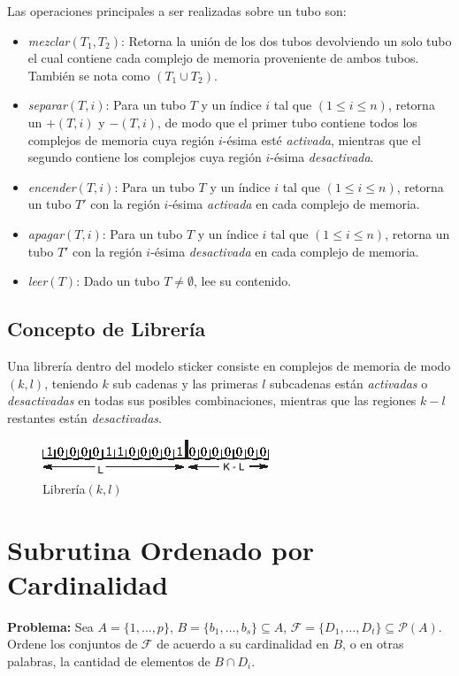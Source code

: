 \documentclass[12pt, letterpaper, twoside]{article}
\begin{document}
    Las operaciones principales a ser realizadas sobre un tubo son:
    \begin{itemize}
        \item \emph{mezclar}$(T_1,T_2)$: Retorna la unión de los dos tubos devolviendo un solo tubo el cual contiene cada complejo de memoria proveniente de ambos tubos. También se nota como $(T_1\cup T_2)$.
        \item \emph{separar}$(T, i)$: Para un tubo $T$ y un índice $i$ tal que $(1 \leq i \leq n)$, retorna un $+(T, i)$ y $-(T, i)$, de modo que el primer tubo contiene todos los complejos de memoria cuya región $i$-ésima esté \emph{activada}, mientras que el segundo contiene los complejos cuya región $i$-ésima \emph{desactivada}.
        \item \emph{encender}$(T, i)$: Para un tubo $T$ y un índice $i$ tal que $(1 \leq i \leq n)$, retorna un tubo $T'$ con la región $i$-ésima \emph{activada} en cada complejo de memoria.
        \item \emph{apagar}$(T, i)$: Para un tubo $T$ y un índice $i$ tal que $(1 \leq i \leq n)$, retorna un tubo $T'$ con la región $i$-ésima \emph{desactivada} en cada complejo de memoria.
        \item \emph{leer}$(T)$: Dado un tubo $T\neq\emptyset$, lee su contenido.
    \end{itemize}
    \subsection{Concepto de Librería}
    Una librería dentro del modelo sticker consiste en complejos de memoria de modo $(k,l)$, teniendo $k$ sub cadenas y las primeras $l$ subcadenas están \emph{activadas} o \emph{desactivadas} en todas sus posibles combinaciones, mientras que las regiones $k -l$ restantes están \emph{desactivadas}\autocite{Taghipour2013}.

    \begin{figure}[h!]
        \centering
        \includegraphics[]{libreria.jpg}
        \caption{Librería$(k,l)$}
    \end{figure}

    \section{Subrutina Ordenado por Cardinalidad}
    \textbf{Problema:} Sea $A = \{1,\dots,p\}$, $B = \{b_1,\dots,b_s\} \subseteq A$, $\mathcal{F} = \{D_1,\dots,D_t\} \subseteq \mathcal{P}(A)$. Ordene los conjuntos de $\mathcal{F}$ de acuerdo a su cardinalidad en $B$, o en otras palabras, la cantidad de elementos de $B\cap D_i$.
\end{document}
